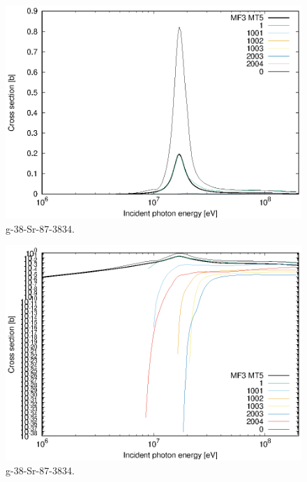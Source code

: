 \begin{figure}
 \includegraphics[width=\linewidth]{eps/g_38-Sr-87_3834.eps}
  \caption{g-38-Sr-87-3834.}
\end{figure}
\begin{figure}
 \includegraphics[width=\linewidth]{eps-log/g_38-Sr-87_3834.eps}
 \caption{g-38-Sr-87-3834.}
\end{figure}
\newpage \clearpage

